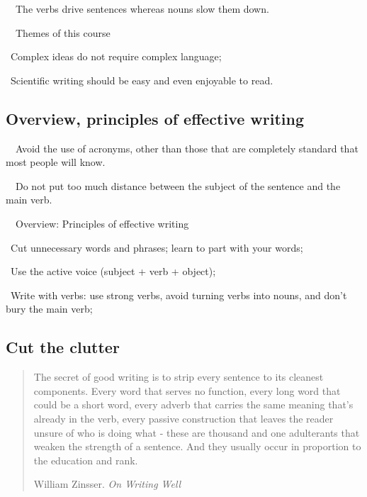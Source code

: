 \documentclass[a4paper, 12pt]{article}
\begin{document}
\par\ \textbullet\ The verbs drive sentences whereas nouns slow them down.

\par\ \textbullet\ Themes of this course
\par\quad\textopenbullet\ Complex ideas do not require complex language;
\par\quad\textopenbullet\ Scientific writing should be easy and even enjoyable to read.

\subsection{Overview, principles of effective writing}

\par\ \textbullet\ Avoid the use of acronyms, other than those that are completely standard that most people will know.

\par\ \textbullet\ Do not put too much distance between the subject of the sentence and the main verb.

\par\ \textbullet\ Overview: Principles of effective writing
\par\quad\textopenbullet\ Cut unnecessary words and phrases; learn to part with your words;
\par\quad\textopenbullet\ Use the active voice (subject + verb + object);
\par\quad\textopenbullet\ Write with verbs: use strong verbs, avoid turning verbs into nouns, and don't bury the main verb;

\newpage\subsection{Cut the clutter}

\vspace{4pt}\begin{quote}
The secret of good writing is to strip every sentence to its cleanest components. 
Every word that serves no function, every long word that could be a short word, 
every adverb that carries the same meaning that's already in the verb, 
every passive construction that leaves the reader unsure of who is doing what
- these are thousand and one adulterants that weaken the strength of a sentence. 
And they usually occur in proportion to the education and rank. 
\begin{flushright}
William Zinsser. \textit{On Writing Well}
\end{flushright}
\end{quote}
\end{document}
